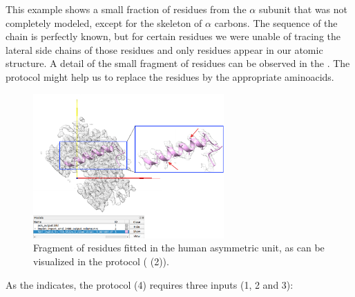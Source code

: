   This example shows a small fraction of residues from the  $\alpha$ subunit that was not completely modeled, except for the skeleton of $\alpha$ carbons. The sequence of the chain is perfectly known, but for certain residues we were unable of tracing the lateral side chains of those residues and only  residues appear in our atomic structure. A detail of the small fragment of  residues can be observed in the . The protocol \phenix {} might help us to replace the  residues by the appropriate aminoacids.
  
   \begin{figure}[H]
  \centering 
  \captionsetup{width=.9\linewidth} 
  \includegraphics[width=0.65\textwidth]{Images/Fig_search_fit_2.pdf}
  \caption{Fragment of  residues fitted in the human  asymmetric unit, as can be visualized in the protocol \chimera {} ( (2)).}
  \label{fig:phenix_search_fit_2}
  \end{figure}
  
  As the  indicates, the protocol  (4) requires three inputs (1, 2 and 3):
  
